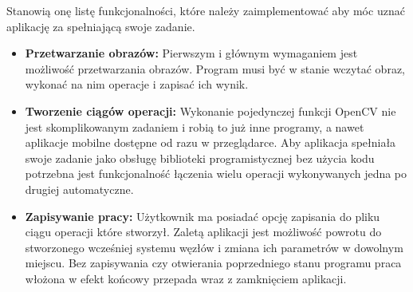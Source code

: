 Stanowią onę listę funkcjonalności, które należy zaimplementować aby móc uznać aplikację za spełniającą swoje zadanie. 

\begin{itemize}
    \item \textbf{Przetwarzanie obrazów:} Pierwszym i głównym wymaganiem jest możliwość przetwarzania obrazów. Program musi być w stanie wczytać obraz, wykonać na nim operacje i zapisać ich wynik.
    \item \textbf{Tworzenie ciągów operacji:} Wykonanie pojedynczej funkcji OpenCV nie jest skomplikowanym zadaniem i robią to już inne programy, a nawet aplikacje mobilne dostępne od razu w przeglądarce. Aby aplikacja spełniała swoje zadanie jako obsługę biblioteki programistycznej bez użycia kodu potrzebna jest funkcjonalność łączenia wielu operacji wykonywanych jedna po drugiej automatyczne.
    \item \textbf{Zapisywanie pracy:} Użytkownik ma posiadać opcję zapisania do pliku ciągu operacji które stworzył. Zaletą aplikacji jest możliwość powrotu do stworzonego wcześniej systemu węzłów i zmiana ich parametrów w dowolnym miejscu. Bez zapisywania czy otwierania poprzedniego stanu programu praca włożona w efekt końcowy przepada wraz z zamknięciem aplikacji.
\end{itemize}